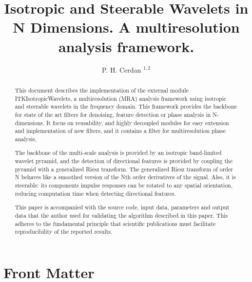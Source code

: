 \documentclass{InsightArticle}
\title{Isotropic and Steerable Wavelets in N Dimensions. A multiresolution analysis framework.}
\author{P. H. Cerdan $^{1,2}$}
\theoremstyle{definition}
\newcommand{\IJhandlerIDnumber}{3558}
\begin{document}

\maketitle

\ifhtml
\chapter*{Front Matter\label{front}}
\fi

\begin{abstract}
\noindent
This document describes the implementation of the external module ITKIsotropicWavelets, a multiresolution (MRA) analysis framework using isotropic and steerable wavelets in the frequency domain. This framework provides the backbone for state of the art filters for denoising, feature detection or phase analysis in N-dimensions. It focus on reusability, and highly decoupled modules for easy extension and implementation of new filters, and it contains a filter for multiresolution phase analysis,

The backbone of the multi-scale analysis is provided by an isotropic band-limited wavelet pyramid, and the detection of directional features is provided by coupling the pyramid with a generalized Riesz transform.
The generalized Riesz transform of order N behaves like a smoothed version of the Nth order derivatives of the signal. Also, it is steerable: its components impulse responses can be rotated to any spatial orientation, reducing computation time when detecting directional features.

This paper is accompanied with the source code, input data, parameters and
output data that the author used for validating the algorithm described in
this paper. This adheres to the fundamental principle that scientific
publications must facilitate reproducibility of the reported results.
\end{abstract}
\end{document}
